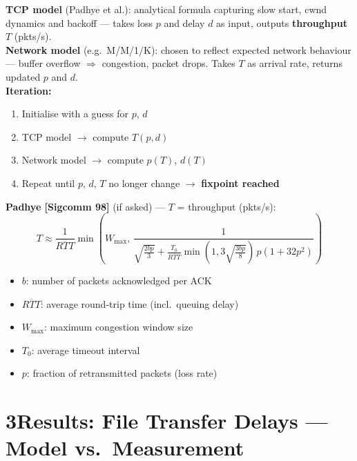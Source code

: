 \documentclass[10pt,a4paper]{article}
\begin{document}
\begin{keybox}
\small\textbf{TCP model} (Padhye et al.): analytical formula capturing slow start, cwnd dynamics and backoff --- takes loss $p$ and delay $d$ as input, outputs \textbf{throughput} $T$ (pkts/s).\\[4pt]
\textbf{Network model} (e.g.\ M/M/1/K): chosen to reflect expected network behaviour --- buffer overflow $\Rightarrow$ congestion, packet drops. Takes $T$ as arrival rate, returns updated $p$ and $d$.\\[4pt]
\textbf{Iteration:}
\begin{enumerate}
  \item Initialise with a guess for $p$, $d$
  \item TCP model $\to$ compute $T(p,d)$
  \item Network model $\to$ compute $p(T)$, $d(T)$
  \item Repeat until $p$, $d$, $T$ no longer change $\to$ \textbf{fixpoint reached}
\end{enumerate}
\end{keybox}
\vspace{2pt}
\begin{notebox}
\textbf{Padhye [Sigcomm 98]} (if asked) --- $T$ = throughput (pkts/s):
\[
T \!\approx\! \frac{1}{\overline{RTT}}\min\!\left(\!W_{\max},\,\frac{1}{\sqrt{\frac{2bp}{3}}+\frac{T_0}{\overline{RTT}}\min(1,3\sqrt{\frac{3bp}{8}})\,p(1{+}32p^2)}\right)
\]
\begin{itemize}
  \item $b$: number of packets acknowledged per ACK
  \item $\overline{RTT}$: average round-trip time (incl.\ queuing delay)
  \item $W_{\max}$: maximum congestion window size
  \item $T_0$: average timeout interval
  \item $p$: fraction of retransmitted packets (loss rate)
\end{itemize}
\end{notebox}

\section*{3\quad Results: File Transfer Delays --- Model vs.\ Measurement}
\end{document}
